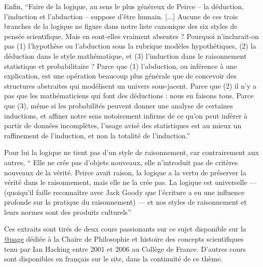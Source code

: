 {Enfin, \enquote{Faire de la logique, au sens le plus généreux de Peirce – la déduction, l’induction et l’abduction – suppose d’être humain. [...] Aucune de ces trois branches de la logique ne figure dans notre liste canonique des six styles de pensée scientifique. Mais en sont-elles vraiment absentes ? Pourquoi n’inclurait-on pas (1) l’hypothèse ou l’abduction sous la rubrique modèles hypothétiques, (2) la déduction dans le style mathématique, et (3) l’induction
dans le raisonnement statistique et probabilitaire ? Parce que (1) l’abduction, ou inférence à une explication, est une opération beaucoup plus générale que de concevoir des structures abstraites qui modélisent un univers sous-jacent. Parce que (2) il n’y a pas que les mathématiciens qui font des déductions : nous en faisons tous. Parce que (3), même si les probabilités peuvent donner une analyse de certaines inductions, et affiner notre sens notoirement infirme de ce qu’on peut inférer à partir de données incomplètes, l’usage avisé des statistiques est au mieux un raffinement de l’induction, et non la totalité de l’induction.}

Pour lui la logique ne tient pas d'un style de raisonnement, car contrairement aux autres, \enquote{ Elle  ne  crée  pas  d’objets  nouveaux, elle  n’introduit pas de critères nouveaux de la vérité. Peirce avait raison, la  logique a la vertu de préserver la vérité dans le raisonnement, mais elle ne la crée pas. La logique est universelle — (quoiqu’il faille reconnaître avec  Jack Goody que l’écriture a eu une influence profonde sur la pratique du raisonnement) — et nos styles de raisonnement et leurs normes sont des produits culturels}

Ces extraits sont tirés de deux cours passionants sur ce sujet \autocites{Hacking2002, Hacking2006} disponible sur la \href{http://www.college-de-france.fr/site/ian-hacking/index.htm}{@page} dédiée à la Chaire de Philosophie et histoire des concepts scientifiques tenu par Ian Hacking entre 2001 et 2006 au Collège de France. D'autres cours sont disponibles en français sur le site, dans la continuité de ce thème.}




